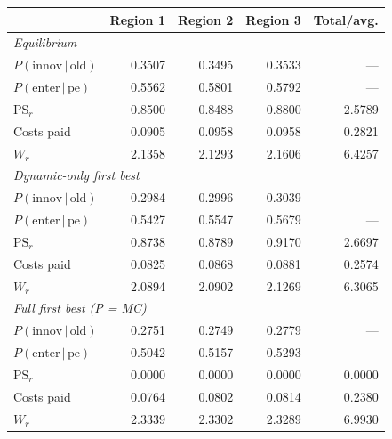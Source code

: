 \begin{tabular}{lrrrr}
\toprule
                                  & Region 1 & Region 2 & Region 3 & Total/avg. \\
\midrule
\multicolumn{5}{l}{\textit{Equilibrium}} \\
\quad $P(\text{innov}\,|\,\text{old})$ & 0.3507 & 0.3495 & 0.3533 & — \\
\quad $P(\text{enter}\,|\,\text{pe})$ & 0.5562 & 0.5801 & 0.5792 & — \\
\quad $\mathrm{PS}_r$ & 0.8500 & 0.8488 & 0.8800 & 2.5789 \\
\quad Costs paid & 0.0905 & 0.0958 & 0.0958 & 0.2821 \\
\quad $W_r$ & 2.1358 & 2.1293 & 2.1606 & 6.4257 \\
\midrule
\multicolumn{5}{l}{\textit{Dynamic-only first best}} \\
\quad $P(\text{innov}\,|\,\text{old})$ & 0.2984 & 0.2996 & 0.3039 & — \\
\quad $P(\text{enter}\,|\,\text{pe})$ & 0.5427 & 0.5547 & 0.5679 & — \\
\quad $\mathrm{PS}_r$ & 0.8738 & 0.8789 & 0.9170 & 2.6697 \\
\quad Costs paid & 0.0825 & 0.0868 & 0.0881 & 0.2574 \\
\quad $W_r$ & 2.0894 & 2.0902 & 2.1269 & 6.3065 \\
\midrule
\multicolumn{5}{l}{\textit{Full first best (P = MC)}} \\
\quad $P(\text{innov}\,|\,\text{old})$ & 0.2751 & 0.2749 & 0.2779 & — \\
\quad $P(\text{enter}\,|\,\text{pe})$ & 0.5042 & 0.5157 & 0.5293 & — \\
\quad $\mathrm{PS}_r$ & 0.0000 & 0.0000 & 0.0000 & 0.0000 \\
\quad Costs paid & 0.0764 & 0.0802 & 0.0814 & 0.2380 \\
\quad $W_r$ & 2.3339 & 2.3302 & 2.3289 & 6.9930 \\
\bottomrule
\end{tabular}

